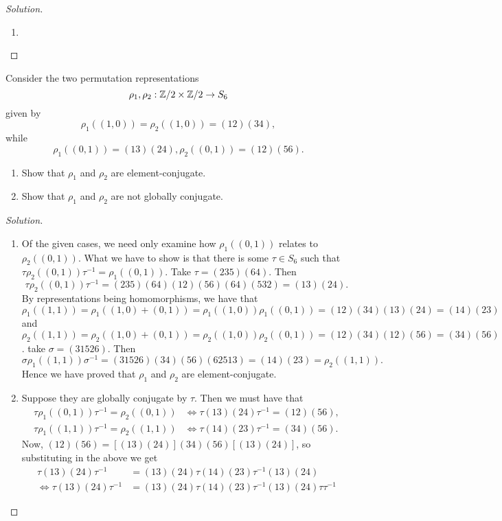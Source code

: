 \begin{proof}[Solution]
\hfill
\begin{enumerate}[font=\normalfont,label=\textbf{(\alph*)}, wide]
\item
\end{enumerate}
\end{proof}

\newpage


\begin{problem}
Consider the two permutation representations
\[
\rho_1, \rho_2 : \mathbb{Z}/2 \times \mathbb{Z}/2 \to S_6
\]
given by
\[
\rho_1 ((1, 0)) = \rho_2((1, 0)) = (12)(34),
\]
while
\[
\rho_1 ((0, 1)) = (13)(24), \rho_2((0, 1)) = (12)(56).
\]
\begin{enumerate}[font=\normalfont,label=\textbf{(\alph*)}]
\item Show that $\rho_1$ and $\rho_2$ are element-conjugate.
\item Show that $\rho_1$ and $\rho_2$ are not globally conjugate.

\end{enumerate}
\end{problem}

\begin{proof}[Solution]
\hfill
\begin{enumerate}[font=\normalfont,label=\textbf{(\alph*)}, wide]
\item Of the given cases, we need only examine how $\rho_1 ((0, 1))$ relates to $\rho_2((0, 1))$. What we have to show is that there is some $\tau \in S_6$ such that $\tau \rho_2((0, 1)) \tau^{-1} = \rho_1((0, 1))$. Take $\tau = (235)(64)$. Then
\[
\tau \rho_2((0, 1)) \tau^{-1} = (235)(64)(12)(56)(64)(532) = (13)(24).
\]
By representations being homomorphisms, we have that $\rho_1((1, 1)) = \rho_1((1, 0) + (0,1)) =  \rho_1((1, 0)) \rho_1((0, 1)) = (12)(34)(13)(24) = (14)(23)$ and $\rho_2((1, 1)) = \rho_2((1, 0) + (0,1)) =  \rho_2((1, 0)) \rho_2((0, 1)) = (12)(34)(12)(56) = (34)(56)$. take $\sigma = (31526)$. Then
\[
\sigma\rho_1((1, 1))\sigma^{-1} = (31526)(34)(56)(62513) = (14)(23) = \rho_2((1,1)).
\]
Hence we have proved that $\rho_1$ and $\rho_2$ are element-conjugate.

\item Suppose they are globally conjugate by $\tau$. Then we must have that
\[
\begin{aligned}
\tau \rho_1((0, 1))\tau^{-1} = \rho_2((0, 1)) &\iff \tau (13)(24)\tau^{-1} = (12)(56), \\
\tau \rho_1((1, 1))\tau^{-1} = \rho_2((1, 1)) &\iff \tau (14)(23)\tau^{-1} = (34)(56).
\end{aligned}
\]
Now, $(12)(56) = [(13)(24)](34)(56)[(13)(24)]$, so substituting in the above we get
\[
\begin{aligned}
\tau (13)(24)\tau^{-1} &= (13)(24)\tau (14)(23)\tau^{-1} (13)(24) \\
\iff \tau (13)(24)\tau^{-1} &= (13)(24)\tau (14)(23)\tau^{-1} (13)(24)\tau\tau^{-1}
\end{aligned}
\]
\end{enumerate}
\end{proof}

